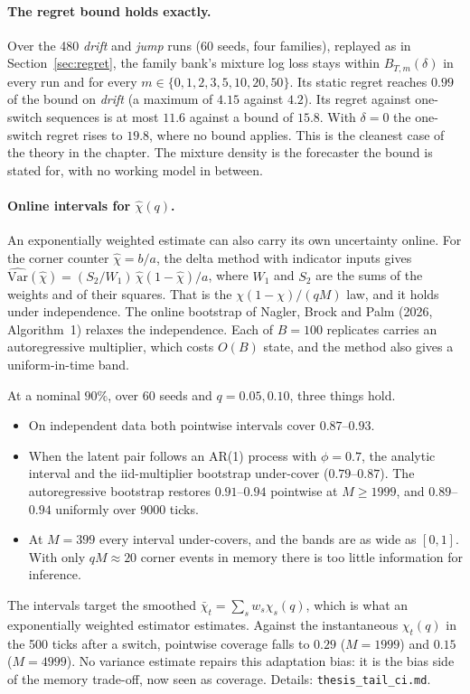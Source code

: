 \paragraph{The regret bound holds exactly.} Over the 480 \emph{drift} and \emph{jump} runs (60
seeds, four families), replayed as in Section~\ref{sec:regret}, the family bank's mixture log loss
stays within $B_{T,m}(\delta)$ in every run and for every $m\in\{0,1,2,3,5,10,20,50\}$. Its static
regret reaches $0.99$ of the bound on \emph{drift} (a maximum of $4.15$ against $4.2$). Its regret
against one-switch sequences is at most $11.6$ against a bound of $15.8$. With $\delta=0$ the
one-switch regret rises to $19.8$, where no bound applies. This is the cleanest case of the theory
in the chapter. The mixture density is the forecaster the bound is stated for, with no working
model in between.

\paragraph{Online intervals for $\hat\chi(q)$.} An exponentially weighted estimate can also carry its
own uncertainty online. For the corner counter $\hat\chi=b/a$, the delta method with indicator inputs gives
$\widehat{\mathrm{Var}}(\hat\chi)=(S_2/W_1)\,\hat\chi(1-\hat\chi)/a$, where $W_1$ and $S_2$ are the sums
of the weights and of their squares. That is the $\chi(1-\chi)/(qM)$ law, and it holds under independence.
The online bootstrap of Nagler, Brock and Palm (2026, Algorithm~1) relaxes the independence. Each of
$B=100$ replicates carries an autoregressive multiplier, which costs $O(B)$ state, and the method also
gives a uniform-in-time band.

At a nominal $90\%$, over 60 seeds and $q=0.05,0.10$, three things hold.
\begin{itemize}
  \item On independent data both pointwise intervals cover $0.87$--$0.93$.
  \item When the latent pair follows an AR(1) process with $\phi=0.7$, the analytic interval and the
    iid-multiplier bootstrap under-cover ($0.79$--$0.87$). The autoregressive bootstrap restores
    $0.91$--$0.94$ pointwise at $M\ge1999$, and $0.89$--$0.94$ uniformly over 9000 ticks.
  \item At $M=399$ every interval under-covers, and the bands are as wide as $[0,1]$. With only
    $qM\approx20$ corner events in memory there is too little information for inference.
\end{itemize}
The intervals target the smoothed $\bar\chi_t=\sum_sw_s\chi_s(q)$, which is what an exponentially
weighted estimator estimates. Against the instantaneous $\chi_t(q)$ in the 500 ticks after a switch,
pointwise coverage falls to $0.29$ ($M=1999$) and $0.15$ ($M=4999$). No variance estimate repairs this
adaptation bias: it is the bias side of the memory trade-off, now seen as coverage. Details:
\texttt{thesis\_tail\_ci.md}.

